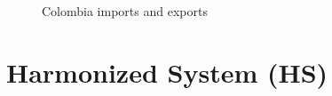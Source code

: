 \documentclass[
  ignorenonframetext,
]{beamer}
\begin{document}
\begin{frame}{}
\label{section-4}
\begin{figure}


\caption{\label{fig-imports-exports-col}Colombia imports and exports}

\end{figure}%
\end{frame}

\section{Harmonized System (HS)}\label{harmonized-system-hs}
\end{document}
